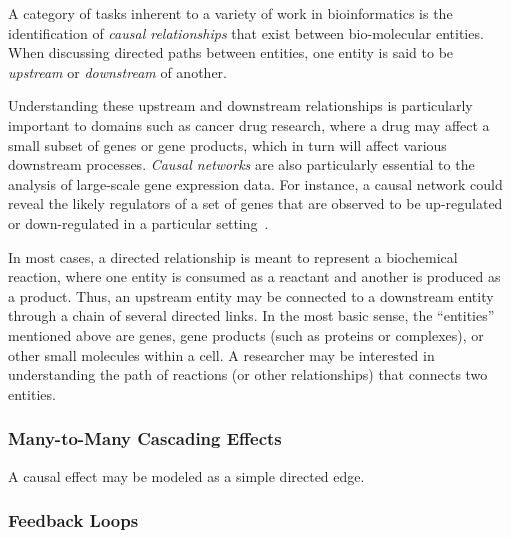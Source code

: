 \documentclass[journal]{vgtc}                %
\begin{document}

A category of tasks inherent to a variety of work in bioinformatics is the identification of \textit{causal relationships} that exist between bio-molecular entities.
When discussing directed paths between entities, one entity is said to be \emph{upstream} or \emph{downstream} of another.

Understanding these upstream and downstream relationships is particularly important to domains such as cancer drug research, where a drug may affect a small subset of genes or gene products, which in turn will affect various downstream processes.
\emph{Causal networks} are also particularly essential to the analysis of large-scale gene expression data.
For instance, a causal network could reveal the likely regulators of a set of genes that are observed to be up-regulated or down-regulated in a particular setting~\cite{felciano2013predictive, Kramer2013ipa-causal}.

In most cases, a directed relationship is meant to represent a biochemical reaction, where one entity is consumed as a reactant and another is produced as a product.
Thus, an upstream entity may be connected to a downstream entity through a chain of several directed links.
In the most basic sense, the ``entities'' mentioned above are genes, gene products (such as proteins or complexes), or other small molecules within a cell.
A researcher may be interested in understanding the path of reactions (or other relationships) that connects two entities.

\subsubsection{Many-to-Many Cascading Effects}

A causal effect may be modeled as a simple directed edge.


\subsubsection{Feedback Loops}
\end{document}
